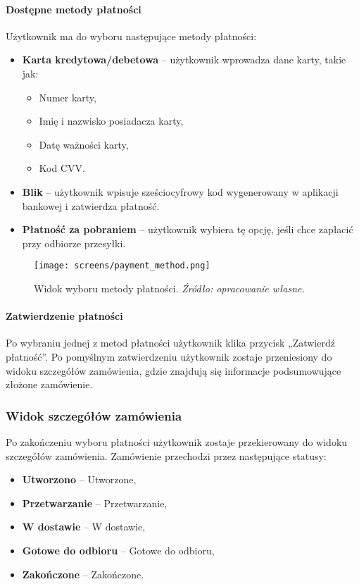 \documentclass[12pt,a4paper,oneside]{article}
\theoremstyle{definition}
\numberwithin{equation}{section}
\begin{document}
\paragraph{Dostępne metody płatności}
Użytkownik ma do wyboru następujące metody płatności:
\begin{itemize}
    \item \textbf{Karta kredytowa/debetowa} – użytkownik wprowadza dane karty, takie jak:
    \begin{itemize}
        \item Numer karty,
        \item Imię i nazwisko posiadacza karty,
        \item Datę ważności karty,
        \item Kod CVV.
    \end{itemize}
    \item \textbf{Blik} – użytkownik wpisuje sześciocyfrowy kod wygenerowany w aplikacji bankowej i zatwierdza płatność.

    \item \textbf{Płatność za pobraniem} – użytkownik wybiera tę opcję, jeśli chce zapłacić przy odbiorze przesyłki.
\end{itemize}

\begin{figure}[H]
    \centering
    \texttt{[image: screens/payment\_method.png]}
    \caption{Widok wyboru metody płatności. \emph{Źródło: opracowanie własne.}}
    \label{fig:payment_method}
\end{figure}

\paragraph{Zatwierdzenie płatności}
Po wybraniu jednej z metod płatności użytkownik klika przycisk „Zatwierdź płatność”. Po pomyślnym zatwierdzeniu użytkownik zostaje przeniesiony do widoku szczegółów zamówienia, gdzie znajdują się informacje podsumowujące złożone zamówienie.





\subsubsection{Widok szczegółów zamówienia}
Po zakończeniu wyboru płatności użytkownik zostaje przekierowany do widoku szczegółów zamówienia. Zamówienie przechodzi przez następujące statusy:
\begin{itemize}
    \item \textbf{Utworzono} – Utworzone,
    \item \textbf{Przetwarzanie} – Przetwarzanie,
    \item \textbf{W dostawie} – W dostawie,
    \item \textbf{Gotowe do odbioru} – Gotowe do odbioru,
    \item \textbf{Zakończone} – Zakończone.
\end{itemize}
\end{document}

